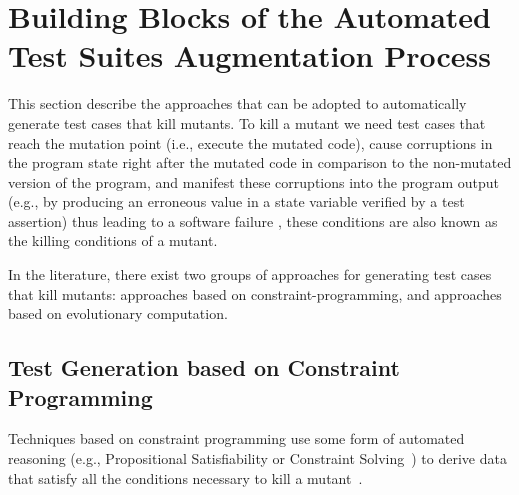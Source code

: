 \clearpage
\section{Building Blocks of the Automated Test Suites Augmentation Process}
\label{sec:testGeneration}

This section describe the approaches that can be adopted to automatically generate test cases that kill mutants.
To kill a mutant we need test cases that reach the mutation point (i.e., execute the mutated code), cause 
corruptions
in the program state right after the mutated code in comparison to the non-mutated version of the program, 
and manifest these corruptions into the program output 
(e.g., by producing an erroneous value in a state variable verified by a test assertion) 
thus leading to a software failure \cite{papadakis2019mutation}, these conditions are also known as the killing conditions of a mutant.

In the literature, there exist two groups of approaches for 
generating test cases that kill mutants:
approaches based on constraint-programming, and approaches based on evolutionary computation.

\subsection{Test Generation based on Constraint Programming}

Techniques based on constraint programming use some form of automated reasoning (e.g., Propositional Satisfiability or Constraint Solving~\cite{SATandCPsurvey:2006}) to derive data that satisfy all the conditions necessary to kill a mutant~\cite{offutt1997automatically}.


